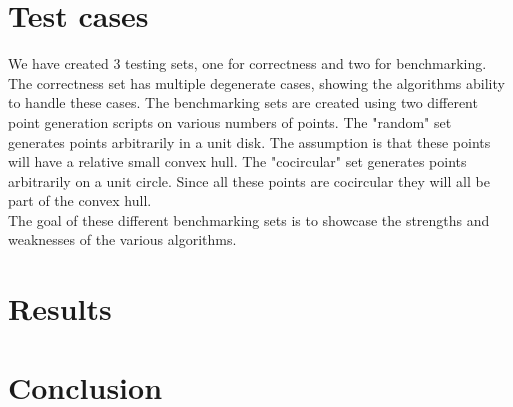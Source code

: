 \documentclass{article}
\begin{document}
\section*{Test cases}
We have created 3 testing sets, one for correctness and two for benchmarking.
The correctness set has multiple degenerate cases, showing the algorithms ability to handle these cases.
The benchmarking sets are created using two different point generation scripts on various numbers of points.
The "random" set generates points arbitrarily in a unit disk. The assumption is that these points will have a relative small convex hull.
The "cocircular" set generates points arbitrarily on a unit circle. Since all these points are cocircular they will all be part of the convex hull.
\\
The goal of these different benchmarking sets is to showcase the strengths and weaknesses of the various algorithms.
\section*{Results}

\section*{Conclusion}
\end{document}

